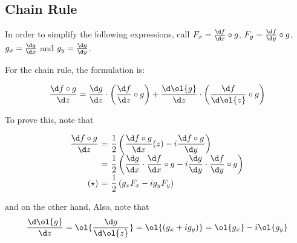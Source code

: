 \subsection*{Chain Rule}

In order to simplify the following expressions, call $F_x = \frac{\d f}{\d x}\circ g$, $F_y = \frac{\d f}{\d y}\circ g$, $g_x = \frac{\d g}{\d x}$ and $g_y = \frac{\d g}{\d y}$. 

For the chain rule, the formulation is:

\[ \frac{\d f\circ g}{\d z} = \frac{\d g}{\d z}\cdot\left( \frac{\d f}{\d z} \circ g \right) + \frac{\d \ol{g}}{\d z}\cdot \left( \frac{\d f}{\d \ol{z}} \circ g \right)  \]

To prove this, note that

\[ \everymath{\displaystyle}
\arraycolsep=1.8pt\def\arraystretch{1.6}
\begin{array}{rcl}
    \frac{\d f\circ g}{\d z} & = & \frac{1}{2} \left( \frac{\d f\circ g}{\d x}(z) - i \frac{\d f\circ g}{\d y} \right)\\
    & = & \frac{1}{2} \left( \frac{\d g}{\d x}\cdot\frac{\d f}{\d x}\circ g - i \frac{\d g}{\d y}\cdot\frac{\d f}{\d y}\circ g \right)\\
    (\star) & = & \frac{1}{2} \left( g_x F_x - i g_y F_y  \right)
\end{array} \]

and on the other hand, Also, note that
\[ \frac{\d \ol{g}}{\d z} = \ol{\frac{\d g}{\d \ol{z}}} = \ol{(g_x + i g_y)} = \ol{g_x} - i \ol{g_y} \]

